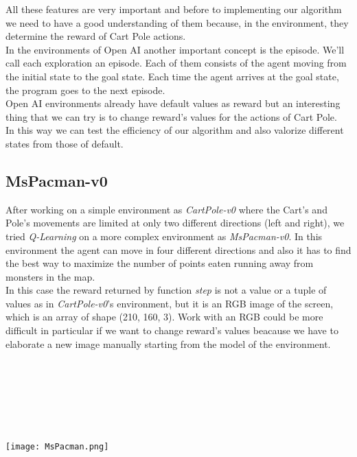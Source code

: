 \documentclass[]{report}
\begin{document}
All these features are very important and before to implementing our algorithm we need to have a good understanding of them because, in the environment, they determine the reward of Cart Pole actions.\\
In the environments of Open AI another important concept is the episode.  We'll call each exploration an episode.  Each of them consists of the agent moving from the initial state to the goal state.  Each time the agent arrives at the goal state, the program goes to the next episode.\\
Open AI environments already have default values as reward but an interesting thing that we can try is to change reward's values for the actions of Cart Pole.\\
In this way we can test the efficiency of our algorithm and also valorize different states from those of default.

\subsection{MsPacman-v0}
After working on a simple environment as \emph{CartPole-v0} where the Cart's and Pole's movements are limited at only two different directions (left and right), we tried \emph{Q-Learning} on a more complex environment as \emph{MsPacman-v0}.
In this environment the agent can move in four different directions and also it has to find the best way to maximize the number of points eaten running away from monsters in the map.\\
In this case the reward returned by function \emph{step} is not a value or a tuple of values as in \emph{CartPole-v0}'s environment, but it is an RGB image of the screen, which is an array of shape (210, 160, 3).
Work with an RGB could be more difficult in particular if we want to change reward's values beacause we have to elaborate a new image manually starting from the model of the environment.\\
\\\\\\\\\\\\
\begin{center}
	\texttt{[image: MsPacman.png]}
\end{center}

\vspace{10 mm}
\end{document}
